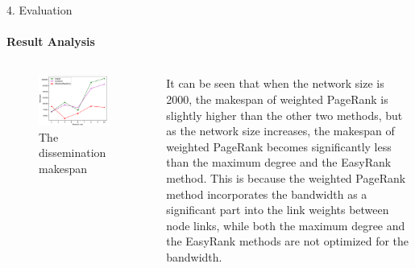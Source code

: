 \documentclass{beamer}		%
\begin{document}
\begin{frame}{4. Evaluation}
\framesubtitle{Result Analysis}
\begin{columns}
\begin{figure}
    \centering
    \includegraphics[width=0.9\textwidth]{imgs/Figure5.png}
    \caption{The dissemination makespan}
\end{figure}
It can be seen that when the network size is 2000, the makespan of weighted PageRank is slightly higher than the other two methods, but as the network size increases, the makespan of weighted PageRank becomes significantly less than the maximum degree and the EasyRank method. This is because the weighted PageRank method incorporates the bandwidth as a significant part into the link weights between node links, while both the maximum degree and the EasyRank methods are not optimized for the bandwidth.
\end{columns}
\end{frame}
\end{document}
